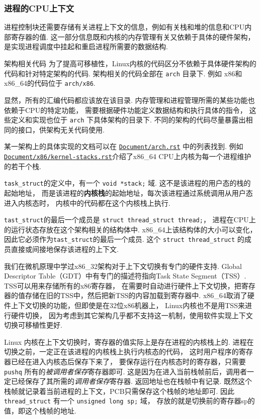 \subsubsection{进程的CPU上下文} \label{context}
进程控制块还需要存储有关进程上下文的信息，例如有关栈和堆的信息和CPU内部寄存器的值.
这一部分信息既和内核的内存管理有关又依赖于具体的硬件架构，
是实现进程调度中挂起和重启进程所需要的数据结构.
\begin{readsrcbox}{架构相关代码}
	为了提高可移植性，Linux内核的代码区分不依赖于具体硬件架构的代码和针对特定架构的代码.
	架构相关的代码全部在 \lstinline{arch} 目录下.
	例如 x86和x86\_64的代码位于 \lstinline{arch/x86}.

	显然，所有的汇编代码都应该放在该目录.
	内存管理和进程管理所需的某些功能也依赖于CPU的特定功能，
	需要根据硬件功能定义数据结构和执行具体的指令，
	这些定义和实现也位于 \lstinline{arch} 下具体架构的目录下.
	不同的架构的代码尽量暴露出相同的接口，供架构无关代码使用.

	某一架构上的具体实现的文档可以在 \href{https://docs.kernel.org/arch.html}{\lstinline{Document/arch.rst}} 中的列表找到.
	例如\href{https://docs.kernel.org/x86/kernel-stacks.html}{\lstinline{Document/x86/kernel-stacks.rst}}介绍了x86\_64 CPU上内核为每一个进程维护的若干个栈.
\end{readsrcbox}
\lstinline{task_struct}的定义中，有一个 \lstinline{void *stack;} 域.
这不是该进程的用户态的栈的起始地址，
而是该进程的\textbf{内核栈}的起始地址，每次该进程通过系统调用从用户态进入内核态时，
内核中的代码都在这个内核栈上执行.

\lstinline{tast_struct}的最后一个成员是 \lstinline{struct thread_struct thread;}，
进程在CPU上的运行状态存放在这个架构相关的结构体中.
x86\_64上该结构体的大小可以变化，因此它必须作为\lstinline{tast_struct}的最后一个成员.
这个 \lstinline{struct thread_struct} 的成员直接或间接地保存该进程的上下文.

我们在微机原理中学过x86\_32架构对于上下文切换有专门的硬件支持.
Global Descriptor Table（GDT）中有专门的描述符指向Task State Segment（TSS）.
TSS可以用来存储所有的x86寄存器，
在需要时自动进行硬件上下文切换，把寄存器的值存储在旧的TSS中，然后把新TSS的内容加载到寄存器中.
x86\_64取消了硬件上下文切换的功能，但即使是在32位x86机器上，
Linux内核也不是用TSS来进行硬件切换，
因为考虑到其它架构几乎都不支持这一机制，使用软件实现上下文切换可移植性更好.

Linux 内核在上下文切换时，寄存器的值实际上是存在进程的内核栈上的.
进程在切换之前，一定正在该进程的内核栈上执行内核态的代码，
这时用户程序的寄存器已经在进入内核态后保存下来了，
要保存运行在内核态时的寄存器，只需要 \lstinline{pushq} 所有的\textit{被调用者保存}寄存器即可.
这是因为在进入当前栈帧前后，调用者一定已经保存了其所需的\textit{调用者保存}寄存器.
返回地址也在栈帧中有记录.
既然这个栈帧就记录着当前进程的上下文，PCB只需保存这个栈帧的地址即可.
因此 \lstinline{thread_struct} 有一个 \lstinline{unsigned long sp;} 域，
存放的就是切换前的寄存器sp的值，即这个栈帧的地址.

